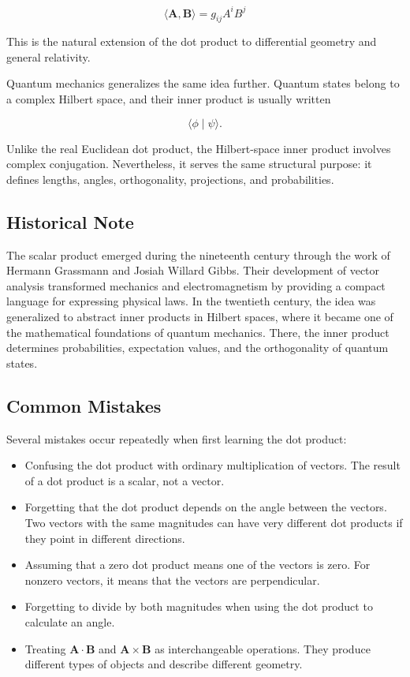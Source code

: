 \[
\boxed{
\langle\mathbf A,\mathbf B\rangle
=
g_{ij}A^iB^j
}
\]

This is the natural extension of the dot product to differential geometry and
general relativity.

Quantum mechanics generalizes the same idea further. Quantum states belong to a
complex Hilbert space, and their inner product is usually written

\[
\langle\phi\mid\psi\rangle.
\]

Unlike the real Euclidean dot product, the Hilbert-space inner product involves
complex conjugation. Nevertheless, it serves the same structural purpose: it
defines lengths, angles, orthogonality, projections, and probabilities.

\subsection{Historical Note}

The scalar product emerged during the nineteenth century through the work of
Hermann Grassmann and Josiah Willard Gibbs. Their development of vector analysis
transformed mechanics and electromagnetism by providing a compact language for
expressing physical laws. In the twentieth century, the idea was generalized to
abstract inner products in Hilbert spaces, where it became one of the
mathematical foundations of quantum mechanics. There, the inner product
determines probabilities, expectation values, and the orthogonality of quantum
states.

\subsection{Common Mistakes}

Several mistakes occur repeatedly when first learning the dot product:

\begin{itemize}
  \item Confusing the dot product with ordinary multiplication of vectors. The
  result of a dot product is a scalar, not a vector.
  \item Forgetting that the dot product depends on the angle between the
  vectors. Two vectors with the same magnitudes can have very different dot
  products if they point in different directions.
  \item Assuming that a zero dot product means one of the vectors is zero. For
  nonzero vectors, it means that the vectors are perpendicular.
  \item Forgetting to divide by both magnitudes when using the dot product to
  calculate an angle.
  \item Treating $\mathbf A\cdot\mathbf B$ and $\mathbf A\times\mathbf B$ as
  interchangeable operations. They produce different types of objects and
  describe different geometry.
\end{itemize}

